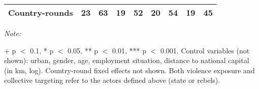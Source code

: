 \begin{table}[!h]
{\begin{threeparttable}
\begin{tabular}[t]{lcccccccc}
Country-rounds & 23 & 63 & 19 & 52 & 20 & 54 & 19 & 45\\
\bottomrule
\end{tabular}
\begin{tablenotes}[para]
\item \textit{Note: } 
\item + p $<$ 0.1, * p $<$ 0.05, ** p $<$ 0.01, *** p $<$ 0.001. Control variables (not shown): urban, gender, age, employment situation, distance to national capital (in km, log). Country-round fixed effects not shown. Both violence exposure and collective targeting refer to the actors defined above (state or rebels).
\end{tablenotes}
\end{threeparttable}}
\end{table}
